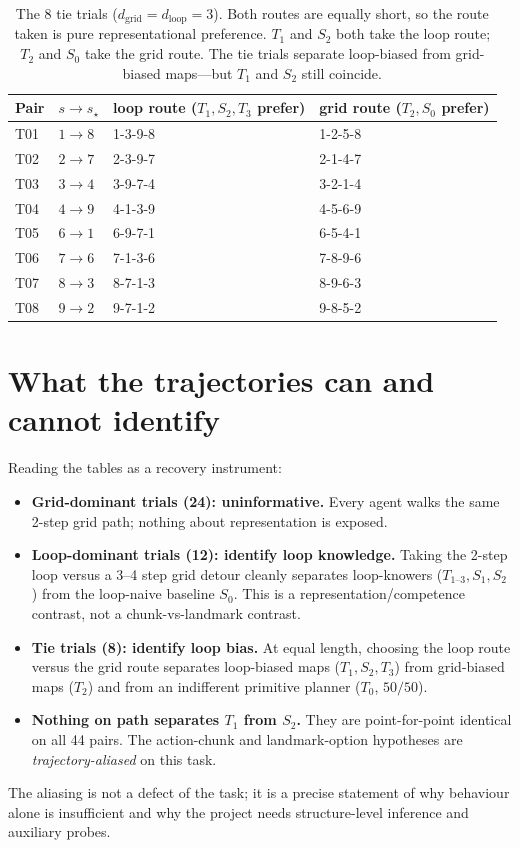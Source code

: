 \documentclass[10pt]{article}
\begin{document}
\begin{table}[htbp]
\centering\footnotesize
\begin{tabularx}{\textwidth}{@{}llYY@{}}
\toprule
Pair & $s\!\to\!s_\star$ & loop route ($T_1,S_2,T_3$ prefer) & grid route ($T_2,S_0$ prefer) \\
\midrule
T01 & $1\!\to\!8$ & 1-3-9-8 & 1-2-5-8 \\
T02 & $2\!\to\!7$ & 2-3-9-7 & 2-1-4-7 \\
T03 & $3\!\to\!4$ & 3-9-7-4 & 3-2-1-4 \\
T04 & $4\!\to\!9$ & 4-1-3-9 & 4-5-6-9 \\
T05 & $6\!\to\!1$ & 6-9-7-1 & 6-5-4-1 \\
T06 & $7\!\to\!6$ & 7-1-3-6 & 7-8-9-6 \\
T07 & $8\!\to\!3$ & 8-7-1-3 & 8-9-6-3 \\
T08 & $9\!\to\!2$ & 9-7-1-2 & 9-8-5-2 \\
\bottomrule
\end{tabularx}
\caption{The 8 tie trials ($d_{\mathrm{grid}}=d_{\mathrm{loop}}=3$). Both routes are
equally short, so the route taken is pure representational preference. $T_1$ and $S_2$ both
take the loop route; $T_2$ and $S_0$ take the grid route. The tie trials separate
loop-biased from grid-biased maps---but $T_1$ and $S_2$ still coincide.}
\label{tab:tie}
\end{table}

\section{What the trajectories can and cannot identify}

Reading the tables as a recovery instrument:
\begin{itemize}
\item \textbf{Grid-dominant trials (24): uninformative.} Every agent walks the same 2-step
grid path; nothing about representation is exposed.
\item \textbf{Loop-dominant trials (12): identify loop knowledge.} Taking the 2-step loop
versus a 3--4 step grid detour cleanly separates loop-knowers ($T_{1\text{--}3},S_1,S_2$)
from the loop-naive baseline $S_0$. This is a representation/competence contrast, not a
chunk-vs-landmark contrast.
\item \textbf{Tie trials (8): identify loop bias.} At equal length, choosing the loop
route versus the grid route separates loop-biased maps ($T_1,S_2,T_3$) from grid-biased
maps ($T_2$) and from an indifferent primitive planner ($T_0$, $50/50$).
\item \textbf{Nothing on path separates $T_1$ from $S_2$.} They are point-for-point
identical on all 44 pairs. The action-chunk and landmark-option hypotheses are
\emph{trajectory-aliased} on this task.
\end{itemize}
The aliasing is not a defect of the task; it is a precise statement of why behaviour alone
is insufficient and why the project needs structure-level inference and auxiliary probes.
\end{document}
